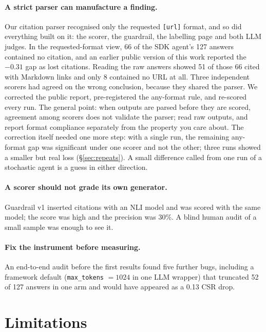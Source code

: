 \documentclass[11pt]{article}
\newcommand{\code}[1]{\texttt{#1}}
\begin{document}
\paragraph{A strict parser can manufacture a finding.} Our citation parser recognised only the
requested \code{[url]} format, and so did everything built on it: the scorer, the guardrail, the
labelling page and both LLM judges. In the requested-format view, 66 of the SDK agent's 127
answers contained no citation, and an earlier public version of this work reported the $-0.31$
gap as lost citations. Reading the raw answers showed 51 of those 66 cited with Markdown links and
only 8 contained no URL at all. Three independent scorers had agreed on the wrong conclusion,
because they shared the parser. We corrected the public report, pre-registered the any-format rule,
and re-scored every run. The general point: when outputs are parsed before they are scored,
agreement among scorers does not validate the parser; read raw outputs, and report format
compliance separately from the property you care about. The correction itself needed one more
step: with a single run, the remaining any-format gap was significant under one scorer and not the
other; three runs showed a smaller but real loss (\S\ref{sec:repeats}). A small difference called
from one run of a stochastic agent is a guess in either direction.

\paragraph{A scorer should not grade its own generator.} Guardrail v1 inserted citations with an
NLI model and was scored with the same model; the score was high and the precision was 30\%. A
blind human audit of a small sample was enough to see it.

\paragraph{Fix the instrument before measuring.} An end-to-end audit before the first results found
five further bugs, including a framework default (\code{max\_tokens} $= 1024$ in one LLM wrapper)
that truncated 52 of 127 answers in one arm and would have appeared as a 0.13 CSR drop.

\section{Limitations}
\end{document}
